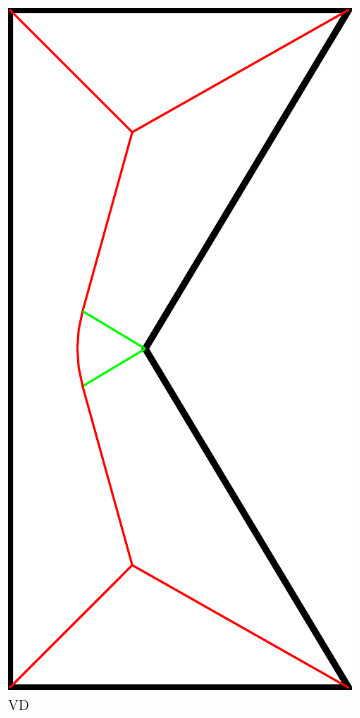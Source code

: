 \begin{figure}
\begin{subfigure}{\figwidth}
\end{subfigure}
\begin{subfigure}{\figwidth}\centering
\includegraphics[width=\figwidthTwo]{sources/method/simple_skeleton_vd}
\caption{VD}\label{shape_decomposition_vd}
\end{subfigure}
\begin{subfigure}{\figwidth}\centering

\end{subfigure}
\end{figure}
